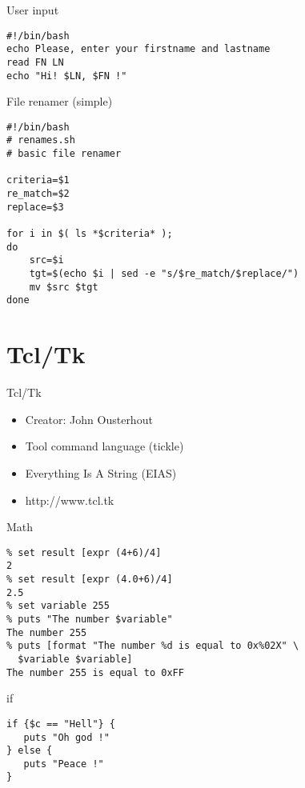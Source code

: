 \begin{frame}[containsverbatim]{User input}
\begin{lstlisting}
#!/bin/bash
echo Please, enter your firstname and lastname
read FN LN 
echo "Hi! $LN, $FN !"
\end{lstlisting}
\end{frame}

\begin{frame}[containsverbatim]{File renamer (simple)}
\begin{lstlisting}
#!/bin/bash
# renames.sh
# basic file renamer

criteria=$1
re_match=$2
replace=$3

for i in $( ls *$criteria* ); 
do
    src=$i
    tgt=$(echo $i | sed -e "s/$re_match/$replace/")
    mv $src $tgt
done
\end{lstlisting}
\end{frame}

\section{Tcl/Tk}
\begin{frame}{Tcl/Tk}
\begin{itemize}
\item Creator: John Ousterhout
\item Tool command language (tickle)
\item Everything Is A String (EIAS)
\item http://www.tcl.tk
\end{itemize}
\end{frame}

\begin{frame}[containsverbatim]{Math}
\lstset{language=tcl}
\begin{lstlisting}
% set result [expr (4+6)/4]
2
% set result [expr (4.0+6)/4]
2.5
% set variable 255
% puts "The number $variable"
The number 255
% puts [format "The number %d is equal to 0x%02X" \
  $variable $variable]
The number 255 is equal to 0xFF
\end{lstlisting}
\end{frame}

\begin{frame}[containsverbatim]{if}
\lstset{language=tcl}
\begin{lstlisting}
if {$c == "Hell"} {
   puts "Oh god !"
} else {
   puts "Peace !"
}
\end{lstlisting}
\end{frame}



